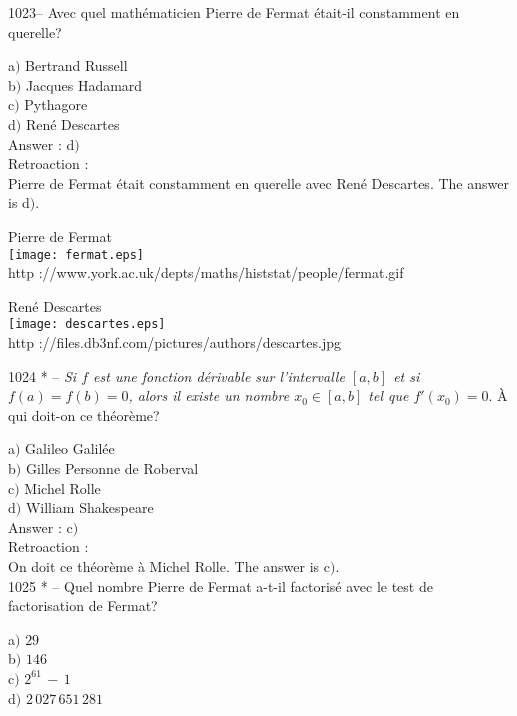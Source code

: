 ﻿\documentclass[letterpaper, 12pt]{article}
\begin{document}
1023-- Avec quel math\'ematicien Pierre de Fermat \'etait-il
constamment en querelle?

a$)$ Bertrand Russell \\
b$)$ Jacques Hadamard \\
c$)$ Pythagore \\
d$)$ Ren\'e Descartes\\

Answer : d$)$\\

Retroaction : \\
Pierre de Fermat \'etait constamment en querelle avec Ren\'e
Descartes. The answer is d$)$.

        \begin{center}
        Pierre de Fermat\\
    \texttt{[image: fermat.eps]}\\
        {\footnotesize http
://www.york.ac.uk/depts/maths/histstat/people/fermat.gif}
    \end{center}

        \begin{center}
        Ren\'e Descartes\\
    \texttt{[image: descartes.eps]}\\
        {\footnotesize http
://files.db3nf.com/pictures/authors/descartes.jpg}
    \end{center}


1024 * -- {\sl Si $f$ est une fonction d\'erivable sur l'intervalle
$[a,b]$ et si $f(a)=f(b)=0$, alors il existe un nombre $x_0\in[a,b]$
tel que $f'(x_0)=0$}. \`A qui doit-on ce th\'eor\`eme?

a$)$ Galileo Galil\'ee \\
b$)$ Gilles Personne de Roberval \\
c$)$ Michel Rolle \\
d$)$ William Shakespeare\\

Answer : c$)$\\

Retroaction : \\
On doit ce th\'eor\`eme \`a Michel Rolle.
The answer is c$)$.\\


1025 * -- Quel nombre Pierre de Fermat a-t-il factoris\'e avec le
test de factorisation de Fermat?

a$)$ $29$ \\
b$)$ $146$ \\
c$)$ $2^{61}\,-\,1$ \\
d$)$ $2\,027\,651\,281$\\
\end{document}
